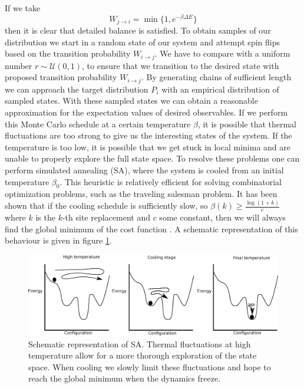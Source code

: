 If we take 
\begin{equation*}
    W_{j\rightarrow i} = \min\{1, e^{-\beta \Delta E} \}
\end{equation*}
then it is clear that detailed balance is satisfied. To obtain samples of our distribution we start in a random state of our system and attempt spin flips based on the transition probability $W_{i\rightarrow j}$. We have to compare with a uniform number $r \sim \mathcal{U}(0,1)$, to ensure that we transition to the desired state with proposed transition probability $W_{i\rightarrow j}$. By generating chains of sufficient length we can approach the target distribution $P_i$ with an empirical distribution of sampled states. With these sampled states we can obtain a reasonable approximation for the expectation values of desired observables.\newline
If we perform this Monte Carlo schedule at a certain temperature $\beta$, it is possible that thermal fluctuations are too strong to give us the interesting states of the system. If the temperature is too low, it is possible that we get stuck in local minima and are unable to properly explore the full state space. To resolve these problems one can perform simulated annealing (SA), where the system is cooled from an initial temperature $\beta_0$. This heuristic is relatively efficient for solving combinatorial optimization problems, such as the traveling salesman problem. It has been shown that if the cooling schedule is sufficiently slow, so $\beta(k) \geq \frac{\log(1+k)}{c}$ where $k$ is the $k$-th site replacement and $c$ some constant, then we will always find the global minimum of the cost function \cite{Geman1984}. A schematic representation of this behaviour is given in figure \ref{fig:sa}.
\begin{figure}[htb!]
    \centering
    \includegraphics[width=\textwidth]{figures/chapter2/SA.eps}
    \caption{Schematic representation of SA. Thermal fluctuations at high temperature allow for a more thorough exploration of the state space. When cooling we slowly limit these fluctuations and hope to reach the global minimum when the dynamics freeze.}
    \label{fig:sa}
\end{figure}

